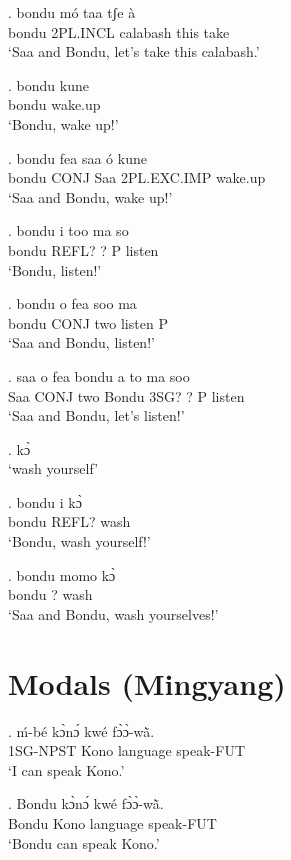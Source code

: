 \documentclass{assets/fieldnotes}
\begin{document}
{\exg. bondu mó taa tʃe à \\
bondu 2PL.INCL calabash this take \\
`Saa and Bondu, let's take this calabash.'


 

\exg. bondu kune \\
bondu wake.up \\
`Bondu, wake up!'

\exg. bondu fea saa ó kune \\
bondu CONJ Saa 2PL.EXC.IMP wake.up \\
`Saa and Bondu, wake up!'

\exg. bondu i too ma so \\
bondu REFL? ? P listen \\
`Bondu, listen!'

\exg. bondu o fea soo ma \\
bondu CONJ two listen P \\
`Saa and Bondu, listen!'

\exg. saa o fea bondu a to ma soo \\
Saa CONJ two Bondu 3SG? ? P listen \\
`Saa and Bondu, let's listen!'


\ex. kɔ̀ \\
`wash yourself'

\exg. bondu i kɔ̀ \\
bondu REFL? wash \\
`Bondu, wash yourself!' 

\exg. bondu momo kɔ̀ \\
bondu ? wash \\
`Saa and Bondu, wash yourselves!'

\section{Modals (Mingyang)} 


\par
{}
\exg. ḿ-bé kɔ̀nɔ́ kwé fɔ̀ɔ̀-wã̀.\\
    1SG-NPST Kono language speak-FUT\\
    `I can speak Kono.'

\exg. Bondu kɔ̀nɔ́ kwé fɔ̀ɔ̀-wã̀.\\
    Bondu Kono language speak-FUT\\
    `Bondu can speak Kono.'

}
\end{document}
